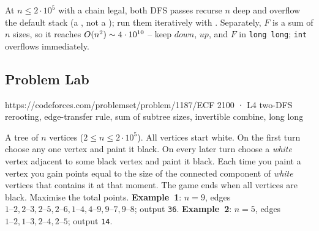 \begin{warningbox}
At $n \le 2\cdot10^{5}$ with a chain legal, both DFS passes recurse $n$ deep
and overflow the default stack (a \re, not a \tle); run them iteratively with
. Separately, $F$ is a sum of $n$ sizes, so it reaches
$O(n^2)\sim 4\cdot10^{10}$ -- keep $\mathit{down}$, $\mathit{up}$, and $F$
in \lstinline{long long}; \lstinline{int} overflows immediately.
\end{warningbox}

\subsection{Problem Lab}

  {https://codeforces.com/problemset/problem/1187/E}{CF 2100 · L4}
  {two-DFS rerooting, edge-transfer rule, sum of subtree sizes, invertible
   combine, long long}

\begin{problemstatement}
A tree of $n$ vertices ($2 \le n \le 2\cdot10^{5}$). All vertices start white.
On the first turn choose any one vertex and paint it black. On every later turn
choose a \emph{white} vertex adjacent to some black vertex and paint it black.
Each time you paint a vertex you gain points equal to the size of the connected
component of \emph{white} vertices that contains it at that moment. The game
ends when all vertices are black. Maximise the total points. \textbf{Example~1}:
$n=9$, edges $1\text{--}2,2\text{--}3,2\text{--}5,2\text{--}6,1\text{--}4,4\text{--}9,9\text{--}7,9\text{--}8$;
output \texttt{36}. \textbf{Example~2}: $n=5$, edges
$1\text{--}2,1\text{--}3,2\text{--}4,2\text{--}5$; output \texttt{14}.
\end{problemstatement}

